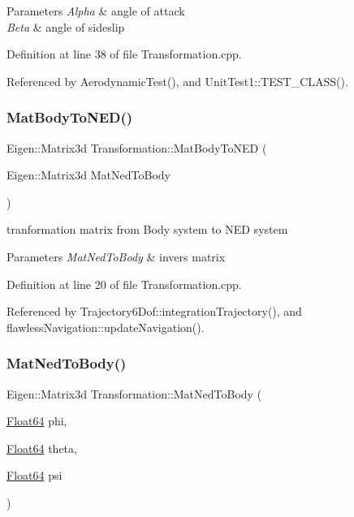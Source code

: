 \begin{DoxyParams}{Parameters}
{\em Alpha} & angle of attack \\
\hline
{\em Beta} & angle of sideslip \\
\hline
\end{DoxyParams}


Definition at line 38 of file Transformation.\+cpp.



Referenced by Aerodynamic\+Test(), and Unit\+Test1\+::\+T\+E\+S\+T\+\_\+\+C\+L\+A\+S\+S().

\mbox{\label{class_transformation_a2c16407225610227ee0c9d2fd2242a29}} 
\subsubsection{\texorpdfstring{Mat\+Body\+To\+N\+E\+D()}{MatBodyToNED()}}
{\footnotesize\ttfamily Eigen\+::\+Matrix3d Transformation\+::\+Mat\+Body\+To\+N\+ED (\begin{DoxyParamCaption}\item[{Eigen\+::\+Matrix3d}]{Mat\+Ned\+To\+Body }\end{DoxyParamCaption})}



tranformation matrix from Body system to N\+ED system 


\begin{DoxyParams}{Parameters}
{\em Mat\+Ned\+To\+Body} & invers matrix \\
\hline
\end{DoxyParams}


Definition at line 20 of file Transformation.\+cpp.



Referenced by Trajectory6\+Dof\+::integration\+Trajectory(), and flawless\+Navigation\+::update\+Navigation().

\mbox{\label{class_transformation_ab33befedbf4f290a0c03367a7fb23e6e}} 
\subsubsection{\texorpdfstring{Mat\+Ned\+To\+Body()}{MatNedToBody()}}
{\footnotesize\ttfamily Eigen\+::\+Matrix3d Transformation\+::\+Mat\+Ned\+To\+Body (\begin{DoxyParamCaption}\item[{\hyperlink{group___tools_ga3f1431cb9f76da10f59246d1d743dc2c}{Float64}}]{phi,  }\item[{\hyperlink{group___tools_ga3f1431cb9f76da10f59246d1d743dc2c}{Float64}}]{theta,  }\item[{\hyperlink{group___tools_ga3f1431cb9f76da10f59246d1d743dc2c}{Float64}}]{psi }\end{DoxyParamCaption})}



